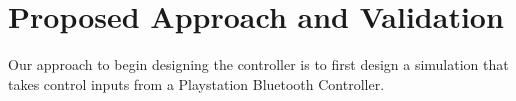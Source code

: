 \section{Proposed Approach and Validation}
Our approach to begin designing the controller is to first design a simulation that takes control inputs from a Playstation Bluetooth Controller. 
